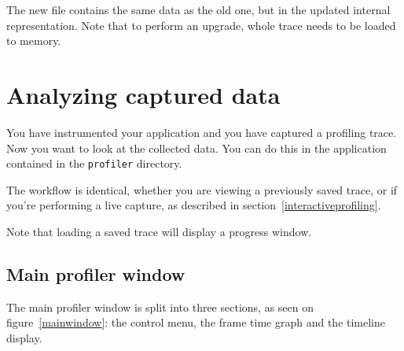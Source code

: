 \documentclass[hidelinks,titlepage,a4paper]{article}
\begin{document}
The new file contains the same data as the old one, but in the updated internal representation. Note that to perform an upgrade, whole trace needs to be loaded to memory.

\section{Analyzing captured data}
\label{analyzingdata}

You have instrumented your application and you have captured a profiling trace. Now you want to look at the collected data. You can do this in the application contained in the \texttt{profiler} directory.

The workflow is identical, whether you are viewing a previously saved trace, or if you're performing a live capture, as described in section~\ref{interactiveprofiling}.

Note that loading a saved trace will display a progress window.

\subsection{Main profiler window}

The main profiler window is split into three sections, as seen on figure~\ref{mainwindow}: the control menu, the frame time graph and the timeline display.
\end{document}
